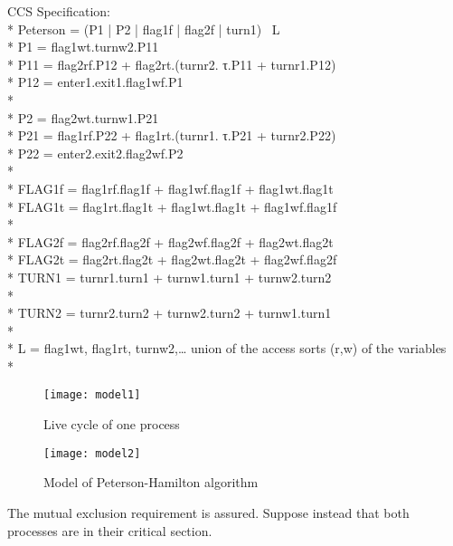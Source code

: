 CCS Specification:\\*
Peterson = (P1 | P2 | flag1f | flag2f | turn1) \ L\\*
P1 = flag1wt.turnw2.P11\\*
P11 = flag2rf.P12 + flag2rt.(turnr2. τ.P11 + turnr1.P12)\\*
P12 = enter1.exit1.flag1wf.P1\\*\\*
P2 = flag2wt.turnw1.P21\\*
P21 = flag1rf.P22 + flag1rt.(turnr1. τ.P21 + turnr2.P22)\\*
P22 = enter2.exit2.flag2wf.P2\\*\\*
FLAG1f = flag1rf.flag1f + flag1wf.flag1f + flag1wt.flag1t\\*
FLAG1t = flag1rt.flag1t + flag1wt.flag1t + flag1wf.flag1f\\*\\*
FLAG2f = flag2rf.flag2f + flag2wf.flag2f + flag2wt.flag2t\\*
FLAG2t = flag2rt.flag2t + flag2wt.flag2t + flag2wf.flag2f\\*
TURN1 = turnr1.turn1 + turnw1.turn1 + turnw2.turn2\\*\\*
TURN2 = turnr2.turn2 + turnw2.turn2 + turnw1.turn1\\*\\*
L = { flag1wt, flag1rt, turnw2,… union of the access sorts (r,w) of the
variables }\\*

\begin{figure}[h!]
\centering
\texttt{[image: model1]}
\caption{Live cycle of one process}
\label{fig:model1}
\end{figure}

\begin{figure}[!ht]
\centering
\texttt{[image: model2]}
\caption{Model of Peterson-Hamilton algorithm}
\label{fig:model2}
\end{figure}

The mutual exclusion requirement is assured. Suppose instead that both processes are in their critical section. 

